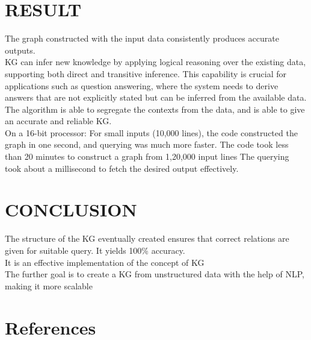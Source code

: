 \documentclass[conference]{IEEEtran}
\begin{document}
\section{RESULT}
The graph constructed with the input data consistently produces accurate outputs.
\\
KG can infer new knowledge by applying logical reasoning over the existing data, supporting both direct and transitive inference. This capability is crucial for applications such as question answering, where the system needs to derive answers that are not explicitly stated but can be inferred from the available data.
\\
The algorithm is able to segregate the contexts from the data, and is able to give an accurate and reliable KG.
\\
On a 16-bit processor:
For small inputs (10,000 lines), the code constructed the graph in one second, and querying was much more faster.
The code took less than 20 minutes to construct a graph from 1,20,000 input lines 
The querying took about a millisecond to fetch the desired output effectively.

\section{CONCLUSION}
The structure of the KG eventually created ensures that correct relations are given for suitable query. It yields 100\% accuracy.
\\
It is an effective implementation of the concept of KG
\\
The further goal is to create a KG from unstructured data with the help of NLP, making it more scalable

\section{References}
\end{document}
